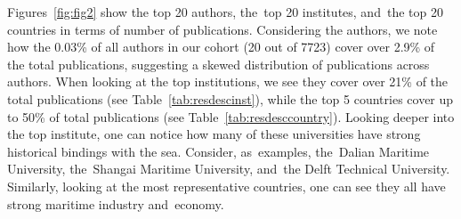\documentclass[jmse,review,accept,pdftex,moreauthors]{Definitions/mdpi}
\begin{document}
Figures~\ref{fig:fig2} show the top 20 authors, the~top 20 institutes, and~the top 20 countries in terms of number of publications. Considering the authors, we note how the 0.03\% of all authors in our cohort (20 out of 7723) cover over 2.9\% of the total publications, suggesting a skewed distribution of publications across authors. When looking at the top institutions, we see they cover over 21\% of the total publications (see Table~\ref{tab:resdescinst}), while the top 5 countries cover up to 50\% of total publications (see Table~\ref{tab:resdesccountry}). Looking deeper into the top institute, one can notice how many of these universities have strong historical bindings with the sea. Consider, as~examples, the~Dalian Maritime University, the~Shangai Maritime University, and~the Delft Technical University. Similarly, looking at the most representative countries, one can see they all have strong maritime industry and~economy.
\end{document}
